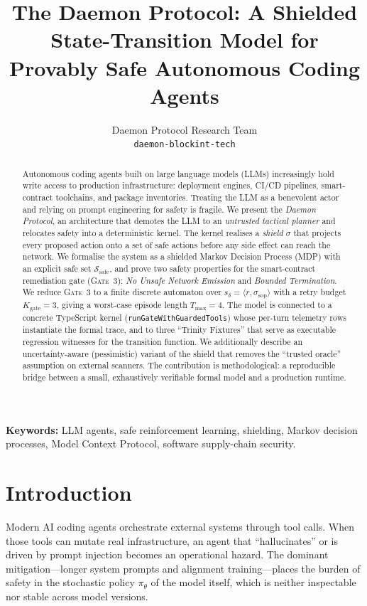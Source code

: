 \documentclass{article}
\title{The Daemon Protocol: A Shielded State-Transition Model for
Provably Safe Autonomous Coding Agents}
\author{%
  Daemon Protocol Research Team \\
  \texttt{daemon-blockint-tech} \\
}
\theoremstyle{plain}
\theoremstyle{definition}
\begin{document}
\maketitle

\begin{abstract}
Autonomous coding agents built on large language models (LLMs) increasingly
hold write access to production infrastructure: deployment engines, CI/CD
pipelines, smart-contract toolchains, and package inventories. Treating the
LLM as a benevolent actor and relying on prompt engineering for safety is
fragile. We present the \emph{Daemon Protocol}, an architecture that demotes
the LLM to an \emph{untrusted tactical planner} and relocates safety into a
deterministic kernel. The kernel realises a \emph{shield} $\sigma$ that
projects every proposed action onto a set of safe actions before any side
effect can reach the network. We formalise the system as a shielded Markov
Decision Process (MDP) with an explicit safe set $\mathcal{S}_{\text{safe}}$,
and prove two safety properties for the smart-contract remediation gate
(\textsc{Gate~3}): \emph{No Unsafe Network Emission} and \emph{Bounded
Termination}. We reduce \textsc{Gate~3} to a finite discrete automaton over
$s_\delta=\langle r,\sigma_{\text{sop}}\rangle$ with a retry budget
$K_{\text{gate}}=3$, giving a worst-case episode length $T_{\max}=4$. The model
is connected to a concrete TypeScript kernel (\texttt{runGateWithGuardedTools})
whose per-turn telemetry rows instantiate the formal trace, and to three
``Trinity Fixtures'' that serve as executable regression witnesses for the
transition function. We additionally describe an uncertainty-aware (pessimistic)
variant of the shield that removes the ``trusted oracle'' assumption on external
scanners. The contribution is methodological: a reproducible bridge between a
small, exhaustively verifiable formal model and a production runtime.
\end{abstract}

\noindent\textbf{Keywords:} LLM agents, safe reinforcement learning, shielding,
Markov decision processes, Model Context Protocol, software supply-chain security.

\section{Introduction}
Modern AI coding agents orchestrate external systems through tool calls. When
those tools can mutate real infrastructure, an agent that ``hallucinates'' or is
driven by prompt injection becomes an operational hazard. The dominant
mitigation---longer system prompts and alignment training---places the burden of
safety in the stochastic policy $\pi_\theta$ of the model itself, which is
neither inspectable nor stable across model versions.
\end{document}
